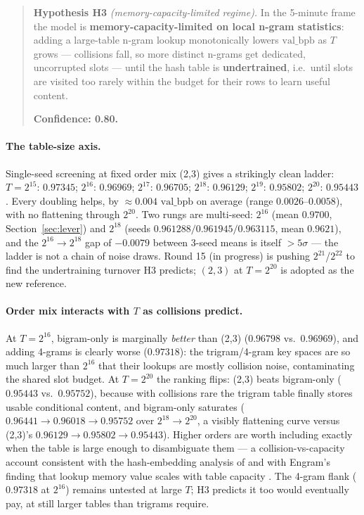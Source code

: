 \documentclass{article}
\newcommand{\valbpb}{\mathrm{val\_bpb}}
\begin{document}
\begin{quote}
\textbf{Hypothesis H3} \emph{(memory-capacity-limited regime).} In the 5-minute frame the model is \textbf{memory-capacity-limited on local n-gram statistics}: adding a large-table n-gram lookup monotonically lowers $\valbpb$ as $T$ grows --- collisions fall, so more distinct n-grams get dedicated, uncorrupted slots --- until the hash table is \textbf{undertrained}, i.e.\ until slots are visited too rarely within the budget for their rows to learn useful content.

\textbf{Confidence: 0.80.}
\end{quote}

\paragraph{The table-size axis.} Single-seed screening at fixed order mix (2,3) gives a strikingly clean ladder: $T = 2^{15}$: $0.97345$; $2^{16}$: $0.96969$; $2^{17}$: $0.96705$; $2^{18}$: $0.96129$; $2^{19}$: $0.95802$; $2^{20}$: $\mathbf{0.95443}$. Every doubling helps, by $\approx 0.004$ $\valbpb$ on average (range $0.0026$--$0.0058$), with no flattening through $2^{20}$. Two rungs are multi-seed: $2^{16}$ (mean $0.9700$, Section~\ref{sec:lever}) and $2^{18}$ (seeds $0.961288 / 0.961945 / 0.963115$, mean $\mathbf{0.9621}$), and the $2^{16} \rightarrow 2^{18}$ gap of $-0.0079$ between 3-seed means is itself $> 5\sigma$ --- the ladder is not a chain of noise draws. Round 15 (in progress) is pushing $2^{21}$/$2^{22}$ to find the undertraining turnover H3 predicts; $(2,3)$ at $T = 2^{20}$ is adopted as the new reference.

\paragraph{Order mix interacts with $T$ as collisions predict.} At $T = 2^{16}$, bigram-only is marginally \emph{better} than (2,3) ($0.96798$ vs.\ $0.96969$), and adding 4-grams is clearly worse ($0.97318$): the trigram/4-gram key spaces are so much larger than $2^{16}$ that their lookups are mostly collision noise, contaminating the shared slot budget. At $T = 2^{20}$ the ranking flips: (2,3) beats bigram-only ($0.95443$ vs.\ $0.95752$), because with collisions rare the trigram table finally stores usable conditional content, and bigram-only saturates ($0.96441 \rightarrow 0.96018 \rightarrow 0.95752$ over $2^{18} \rightarrow 2^{20}$, a visibly flattening curve versus (2,3)'s $0.96129 \rightarrow 0.95802 \rightarrow 0.95443$). Higher orders are worth including exactly when the table is large enough to disambiguate them --- a collision-vs-capacity account consistent with the hash-embedding analysis of \citet{svenstrup2017hash} and with Engram's finding that lookup memory value scales with table capacity \cite{engram2026}. The 4-gram flank ($0.97318$ at $2^{16}$) remains untested at large $T$; H3 predicts it too would eventually pay, at still larger tables than trigrams require.
\end{document}
